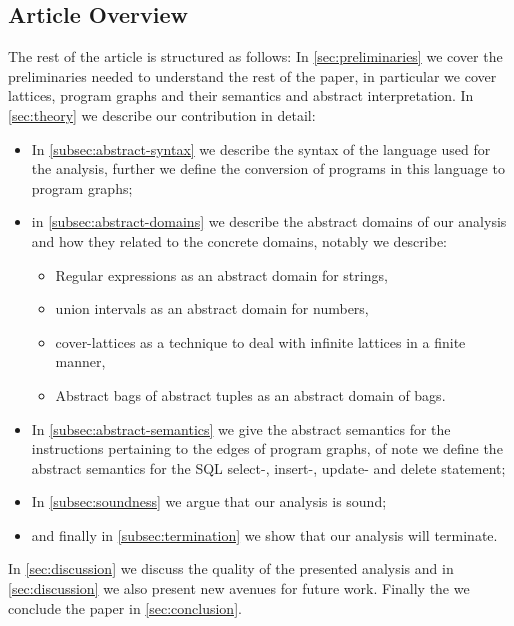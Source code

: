 \subsection{Article Overview}\label{subsec:article-overview}
The rest of the article is structured as follows:
In \autoref{sec:preliminaries} we cover the preliminaries needed to understand the rest of the paper, in particular we cover lattices, program graphs and their semantics and abstract interpretation.
In \autoref{sec:theory} we describe our contribution in detail:

\begin{itemize}
    \item In \autoref{subsec:abstract-syntax} we describe the syntax of the language used for the analysis, further we define the conversion of programs in this language to program graphs;
    \item in \autoref{subsec:abstract-domains} we describe the abstract domains of our analysis and how they related to the concrete domains, notably we describe:
    \begin{itemize}
        \item Regular expressions as an abstract domain for strings,
        \item union intervals as an abstract domain for numbers,
        \item cover-lattices as a technique to deal with infinite lattices in a finite manner,
        \item Abstract bags of abstract tuples as an abstract domain of bags.
    \end{itemize}
    \item In \autoref{subsec:abstract-semantics} we give the abstract semantics for the instructions pertaining to the edges of program graphs, of note we define the abstract semantics for the SQL select-, insert-, update- and delete statement;
    \item In \autoref{subsec:soundness} we argue that our analysis is sound;
    \item and finally in \autoref{subsec:termination} we show that our analysis will terminate.
\end{itemize}

In \autoref{sec:discussion} we discuss the quality of the presented analysis and in \autoref{sec:discussion} we also present new avenues for future work.
Finally the we conclude the paper in \autoref{sec:conclusion}. 




